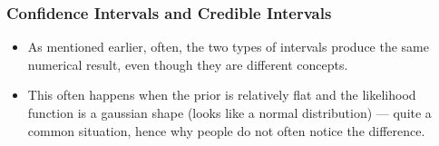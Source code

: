 \documentclass{beamer}
\begin{document}
\begin{frame}
\frametitle{Confidence Intervals and Credible Intervals}
\begin{itemize}
\item As mentioned earlier, often, the two types of intervals produce the same
numerical result, even though they are different concepts. \pause
\item This often happens when the prior is relatively flat and the likelihood function
is a gaussian shape (looks like a normal distribution) --- quite a common
situation, hence why people do not often notice the difference.
\end{itemize}

\end{frame}
\end{document}
